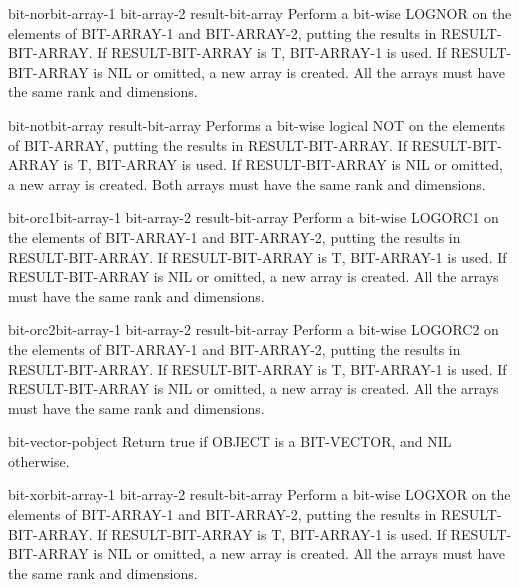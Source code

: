 \begin{function}{bit-nor}{bit-array-1 bit-array-2 \op result-bit-array}{}{}
  Perform a bit-wise LOGNOR on the elements of BIT-ARRAY-1 and BIT-ARRAY-2,
  putting the results in RESULT-BIT-ARRAY. If RESULT-BIT-ARRAY is T,
  BIT-ARRAY-1 is used. If RESULT-BIT-ARRAY is NIL or omitted, a new array is
  created. All the arrays must have the same rank and dimensions.
\end{function}

\begin{function}{bit-not}{bit-array \op result-bit-array}{}{}
  Performs a bit-wise logical NOT on the elements of BIT-ARRAY,
  putting the results in RESULT-BIT-ARRAY. If RESULT-BIT-ARRAY is T,
  BIT-ARRAY is used. If RESULT-BIT-ARRAY is NIL or omitted, a new array is
  created. Both arrays must have the same rank and dimensions.
\end{function}

\begin{function}{bit-orc1}{bit-array-1 bit-array-2 \op result-bit-array}{}{}
  Perform a bit-wise LOGORC1 on the elements of BIT-ARRAY-1 and BIT-ARRAY-2,
  putting the results in RESULT-BIT-ARRAY. If RESULT-BIT-ARRAY is T,
  BIT-ARRAY-1 is used. If RESULT-BIT-ARRAY is NIL or omitted, a new array is
  created. All the arrays must have the same rank and dimensions.
\end{function}

\begin{function}{bit-orc2}{bit-array-1 bit-array-2 \op result-bit-array}{}{}
  Perform a bit-wise LOGORC2 on the elements of BIT-ARRAY-1 and BIT-ARRAY-2,
  putting the results in RESULT-BIT-ARRAY. If RESULT-BIT-ARRAY is T,
  BIT-ARRAY-1 is used. If RESULT-BIT-ARRAY is NIL or omitted, a new array is
  created. All the arrays must have the same rank and dimensions.
\end{function}

\begin{function}{bit-vector-p}{object}{}{}
  Return true if OBJECT is a BIT-VECTOR, and NIL otherwise.
\end{function}

\begin{function}{bit-xor}{bit-array-1 bit-array-2 \op result-bit-array}{}{}
  Perform a bit-wise LOGXOR on the elements of BIT-ARRAY-1 and BIT-ARRAY-2,
  putting the results in RESULT-BIT-ARRAY. If RESULT-BIT-ARRAY is T,
  BIT-ARRAY-1 is used. If RESULT-BIT-ARRAY is NIL or omitted, a new array is
  created. All the arrays must have the same rank and dimensions.
\end{function}

